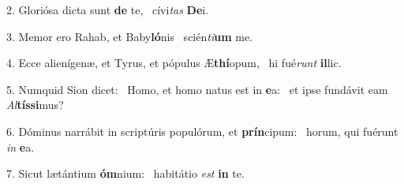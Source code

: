 2. Gloriósa dicta sunt \textbf{de} te, \ast\  cívi\textit{tas} \textbf{De}i.\

3. Memor ero Rahab, et Baby\textbf{ló}nis \ast\  scién\textit{ti}\textbf{um} me.\

4. Ecce alienígenæ, et Tyrus, et pópulus Æ\textbf{thí}opum, \ast\  hi fué\textit{runt} \textbf{il}lic.\

5. Numquid Sion dicet: \dag\  Homo, et homo natus est in \textbf{e}a: \ast\  et ipse fundávit eam \textit{Al}\textbf{tís}\textbf{si}mus?\

6. Dóminus narrábit in scriptúris populórum, et \textbf{prín}cipum: \ast\  horum, qui fuérunt \textit{in} \textbf{e}a.\

7. Sicut lætántium \textbf{óm}nium: \ast\  habitátio \textit{est} \textbf{in} te.\

